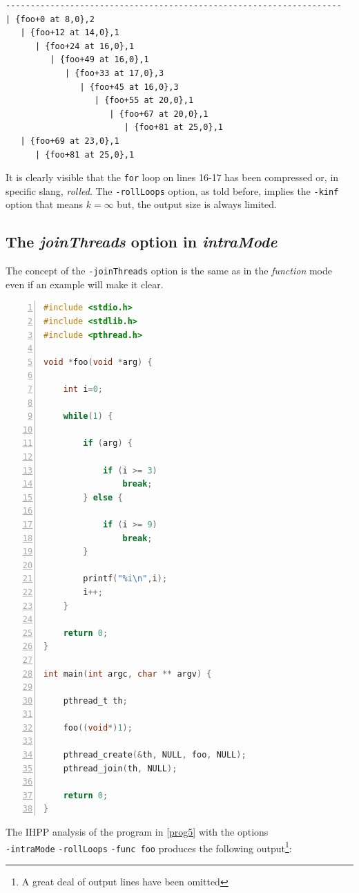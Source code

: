 \documentclass[a4paper,11pt]{report}
\begin{document}
\begin{lstlisting}[label=out10, caption={an output of IHPP with rollLoops option}]
--------------------------------------------------------------------
| {foo+0 at 8,0},2
   | {foo+12 at 14,0},1
      | {foo+24 at 16,0},1
         | {foo+49 at 16,0},1
            | {foo+33 at 17,0},3
               | {foo+45 at 16,0},3
                  | {foo+55 at 20,0},1
                     | {foo+67 at 20,0},1
                        | {foo+81 at 25,0},1
   | {foo+69 at 23,0},1
      | {foo+81 at 25,0},1
\end{lstlisting}

It is clearly visible that the \verb|for| loop on lines 16-17 
has been compressed or, in specific slang, \emph{rolled}.
The \verb|-rollLoops| option, as told before, implies the \verb|-kinf| option
that means $k=\infty$ but, the output size is always limited.

\subsection{The \emph{joinThreads} option in \emph{intraMode}}

The concept of the \verb|-joinThreads| option is the same as in the 
\emph{function} mode even if an example will make it clear. 

\begin{lstlisting}[language=C, 
	caption={prog5.c, an example program}, label=prog5, frame=leftline, numbers=left]
#include <stdio.h>
#include <stdlib.h>
#include <pthread.h>

void *foo(void *arg) {

	int i=0;

	while(1) {

		if (arg) {
		
			if (i >= 3)
				break;	
		} else {

			if (i >= 9)
				break;
		}
		
		printf("%i\n",i);
		i++;
	}

	return 0;
}

int main(int argc, char ** argv) {

	pthread_t th;
	
	foo((void*)1);

	pthread_create(&th, NULL, foo, NULL);
	pthread_join(th, NULL);

	return 0;
}

\end{lstlisting}

\noindent
The IHPP analysis of the program in \cref{prog5} with the options\\\verb|-intraMode| \verb|-rollLoops| \verb|-func foo| produces the following output\footnote{A great deal of output lines have been omitted}:
\end{document}
